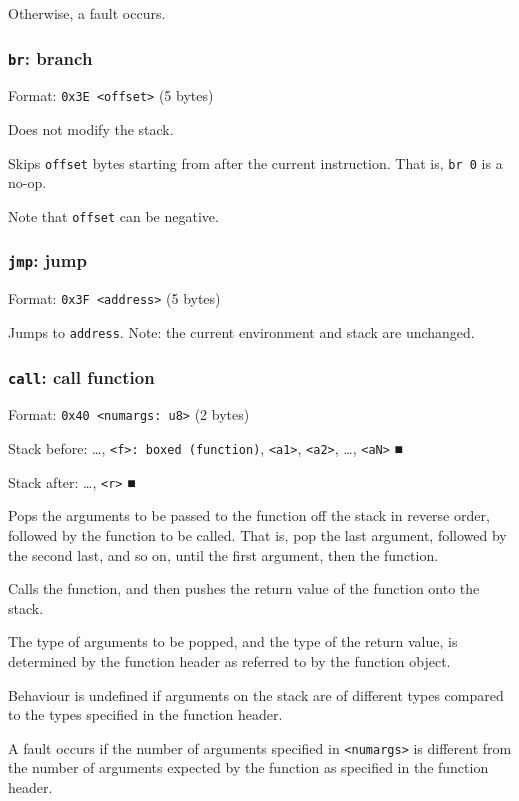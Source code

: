 \documentclass[11pt]{article}
\begin{document}
Otherwise, a fault occurs.

\subsubsection{\texttt{br}: branch}
\label{sec:org71bb9a3}
Format: \texttt{0x3E <offset>} (5 bytes)

Does not modify the stack.

Skips \texttt{offset} bytes starting from after the current instruction. That
is, \texttt{br 0} is a no-op.

Note that \texttt{offset} can be negative.

\subsubsection{\texttt{jmp}: jump}
\label{sec:orgeb956da}
Format: \texttt{0x3F <address>} (5 bytes)

Jumps to \texttt{address}. Note: the current environment and stack are
unchanged.

\subsubsection{\texttt{call}: call function}
\label{sec:orgc60978b}
Format: \texttt{0x40 <numargs: u8>} (2 bytes)

Stack before: \ldots{}​, \texttt{<f>: boxed (function)}, \texttt{<a1>}, \texttt{<a2>}, \ldots{}​,
\texttt{<aN>} ■

Stack after: \ldots{}​, \texttt{<r>} ■

Pops the arguments to be passed to the function off the stack in reverse
order, followed by the function to be called. That is, pop the last
argument, followed by the second last, and so on, until the first
argument, then the function.

Calls the function, and then pushes the return value of the function
onto the stack.

The type of arguments to be popped, and the type of the return value, is
determined by the function header as referred to by the function object.

Behaviour is undefined if arguments on the stack are of different types
compared to the types specified in the function header.

A fault occurs if the number of arguments specified in \texttt{<numargs>} is
different from the number of arguments expected by the function as
specified in the function header.
\end{document}
